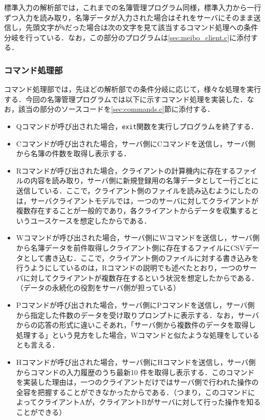 \documentclass[11pt]{jsarticle}
\begin{document}
標準入力の解析部では，これまでの名簿管理プログラム同様，標準入力から一行ずつ入力を読み取り，名簿データが入力された場合はそれをサーバにそのまま送信し，先頭文字が{\tt \%}だった場合は次の文字を見て該当するコマンド処理への条件分岐を行っている．なお，この部分のプログラムは\ref{sec:meibo_client.c}に添付する．

\subsubsection{コマンド処理部}

コマンド処理部では，先ほどの解析部での条件分岐に応じて，様々な処理を実行する．今回の名簿管理プログラムでは以下に示すコマンド処理を実装した．なお，該当の部分のソースコードを\ref{sec:commands.c}節に添付する．

\begin{itemize}
      \item Qコマンドが呼び出された場合，{\tt exit}関数を実行しプログラムを終了する．
      \item Cコマンドが呼び出された場合，サーバ側にCコマンドを送信し，サーバ側から名簿の件数を取得し表示する．
      \item Rコマンドが呼び出された場合，クライアントの計算機内に存在するファイルの内容を読み取り，サーバ側に新規登録用の名簿データとして一行ごとに送信している．ここで，クライアント側のファイルを読み込むようにしたのは，サーバクライアントモデルでは，一つのサーバに対してクライアントが複数存在することが一般的であり，各クライアントからデータを収集するというユースケースを想定したからである．
      \item Wコマンドが呼び出された場合，サーバ側にWコマンドを送信し，サーバ側から名簿データを前件取得しクライアント側に存在するファイルにCSVデータとして書き込む．ここで，クライアント側のファイルに対する書き込みを行うようにしているのは，Rコマンドの説明でも述べたとおり，一つのサーバに対してクライアントが複数存在するという状況を想定したからである．（データの永続化の役割をサーバ側が担っている）
      \item Pコマンドが呼び出された場合，サーバ側にPコマンドを送信し，サーバ側から指定した件数のデータを受け取りプロンプトに表示する．なお，サーバからの応答の形式に違いこそあれ，「サーバ側から複数件のデータを取得し処理する」という見方をした場合，Wコマンドと似たような処理をしているとも言える．
      \item Hコマンドが呼び出された場合，サーバ側にHコマンドを送信し，サーバ側からコマンドの入力履歴のうち最新10
      件を取得し表示する．このコマンドを実装した理由は，一つのクライアントだけではサーバ側で行われた操作の全容を把握することができなかったからである．（つまり，このコマンドによってクライアントAが，クライアントBがサーバに対して行った操作を知ることができる）
\end{itemize}
\end{document}
